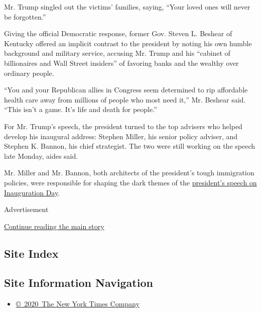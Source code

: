 Mr. Trump singled out the victims' families, saying, ``Your loved ones
will never be forgotten.''

Giving the official Democratic response, former Gov. Steven L. Beshear
of Kentucky offered an implicit contrast to the president by noting his
own humble background and military service, accusing Mr. Trump and his
``cabinet of billionaires and Wall Street insiders'' of favoring banks
and the wealthy over ordinary people.

``You and your Republican allies in Congress seem determined to rip
affordable health care away from millions of people who most need it,''
Mr. Beshear said. ``This isn't a game. It's life and death for people.''

For Mr. Trump's speech, the president turned to the top advisers who
helped develop his inaugural address: Stephen Miller, his senior policy
adviser, and Stephen K. Bannon, his chief strategist. The two were still
working on the speech late Monday, aides said.

Mr. Miller and Mr. Bannon, both architects of the president's tough
immigration policies, were responsible for shaping the dark themes of
the
\href{https://www.nytimes3xbfgragh.onion/2017/01/20/us/politics/trump-presidency.html}{president's
speech on Inauguration Day}.

Advertisement

\protect\hyperlink{after-bottom}{Continue reading the main story}

\hypertarget{site-index}{%
\subsection{Site Index}\label{site-index}}

\hypertarget{site-information-navigation}{%
\subsection{Site Information
Navigation}\label{site-information-navigation}}

\begin{itemize}
\tightlist
\item
  \href{https://help.nytimes3xbfgragh.onion/hc/en-us/articles/115014792127-Copyright-notice}{©~2020~The
  New York Times Company}
\end{itemize}

